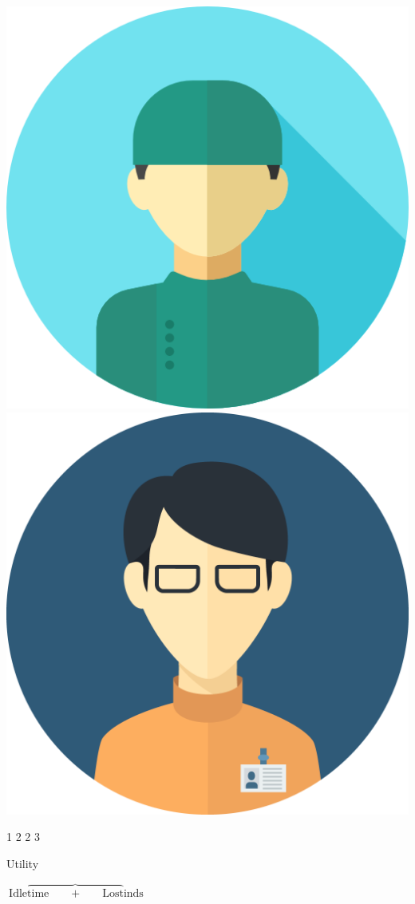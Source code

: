 \begin{frame}
    \hspace{0.4cm}
    \includegraphics[scale=0.1]{Bin/staff_avatars/doctor_2.png}
    \hspace{0.4cm}
    \includegraphics[scale=0.04]{Bin/staff_avatars/doctor_3.png}

    \LARGE
    \vspace{0.5cm}
    1 \hspace{1.4cm} 2 \hspace{1.5cm} 2 \hspace{1.5cm} 3

    \vspace{1.5cm}
    Utility

    \small
    \(\text{Idle} \overbrace{\text{time} \qquad + \qquad \text{Lost}} \text{inds}\)
\end{frame}


